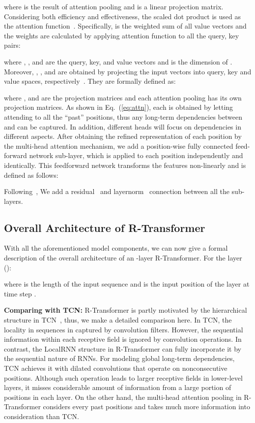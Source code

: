 \documentclass{article} \usepackage{iclr2019_conference,times}
\begin{document}
\noindent where  is the result of  attention pooling and  is a linear projection matrix. Considering both efficiency and effectiveness, the scaled dot product is used as the attention function~\citep{vaswani2017attention}. Specifically,  is the weighted sum of all value vectors and the weights are calculated by applying attention function to all the query, key pairs:


\noindent where , , and  are the query, key, and value vectors and  is the dimension of . Moreover, , , and  are obtained by projecting the input vectors into query, key and value spaces, respectively~\citep{vaswani2017attention}. They are formally defined as:

\noindent where ,  and  are the projection matrices and each  attention pooling  has its own projection matrices. As shown in Eq.~(\ref{eq:attn}), each  is obtained by letting  attending to all the ``past'' positions, thus any long-term dependencies between  and  can be captured. In addition, different heads will focus on dependencies in different aspects. After obtaining the refined representation of each position by the multi-head attention mechanism, we add a position-wise fully connected feed-forward network sub-layer, which is applied to each position independently and identically. This feedforward network transforms the features non-linearly and is defined as follows:

Following~\citep{vaswani2017attention}, We add a residual~\citep{he2016deep} and layernorm~\citep{ba2016layer} connection between all the sub-layers.

\subsection{Overall Architecture of R-Transformer}

With all the aforementioned model components, we can now give a formal description of the overall architecture of an -layer R-Transformer. For the  layer ():

\noindent where  is the length of the input sequence and  is the input position of the layer  at time step .

{\bf Comparing with TCN:} R-Transformer is partly motivated by the hierarchical structure in TCN~\citet{bai2018empirical}, thus, we make a detailed comparison here. In TCN, the locality in sequences in captured by convolution filters. However, the sequential information within each receptive field is ignored by convolution operations. In contrast, the LocalRNN structure in R-Transformer can fully incorporate it by the sequential nature of RNNs. For modeling global long-term dependencies, TCN achieves it with dilated convolutions that operate on nonconsecutive positions. Although such operation leads to larger receptive fields in lower-level layers, it misses considerable amount of information from a large portion of positions in each layer. On the other hand, the multi-head attention pooling in R-Transformer considers every past positions and takes much more information into consideration than TCN.
\end{document}
